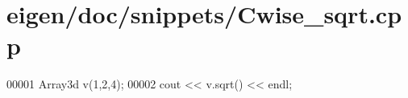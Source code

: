 \hypertarget{eigen_2doc_2snippets_2_cwise__sqrt_8cpp_source}{}\section{eigen/doc/snippets/\+Cwise\+\_\+sqrt.cpp}
\label{eigen_2doc_2snippets_2_cwise__sqrt_8cpp_source}

\begin{DoxyCode}
00001 Array3d v(1,2,4);
00002 cout << v.sqrt() << endl;
\end{DoxyCode}
